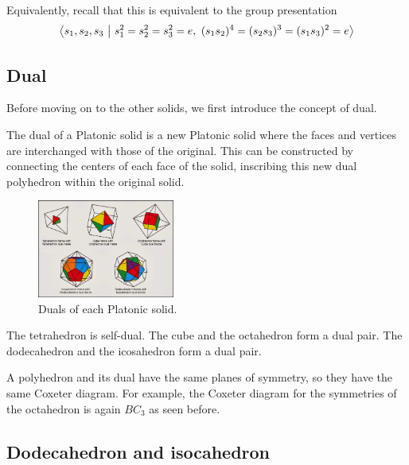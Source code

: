 \documentclass[../main.tex]{subfiles}
\begin{document}
Equivalently, recall that this is equivalent to the group presentation
\[
\abr{s_1,s_2,s_3 \ \middle| \ s_1^2 = s_2^2 = s_3^2 = e, \ (s_1s_2)^4 = (s_2s_3)^3 = (s_1s_3)^2 = e}
\]

\subsection{Dual}
Before moving on to the other solids, we first introduce the concept of dual.
\begin{definition}
   The dual of a Platonic solid is a new Platonic solid where the faces and vertices are interchanged with those of the original. This can be
constructed by connecting the centers of each face of the solid, inscribing this new dual polyhedron
within the original solid.
\end{definition}

\begin{figure}[ht]
    \centering
    \includegraphics[width=0.4\textwidth]{PlatonicSolidsDual.jpg}
    \caption{Duals of each Platonic solid.}
    \label{}
\end{figure}

\begin{remark}
    The tetrahedron is self-dual. The cube and the octahedron form a dual pair. The dodecahedron and the icosahedron form a dual pair.
\end{remark}

\begin{remark}
A polyhedron and its dual have the same planes of symmetry, so they have the same Coxeter diagram. For example, the Coxeter diagram for the symmetries of the octahedron is again $BC_{3}$ as seen before.   
\end{remark}

\subsection{Dodecahedron and isocahedron}
\end{document}
